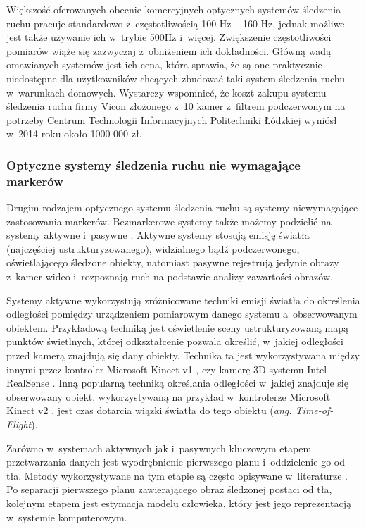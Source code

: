 Większość oferowanych obecnie komercyjnych optycznych systemów śledzenia ruchu pracuje standardowo z~częstotliwością 100 Hz -- 160 Hz, jednak możliwe jest także używanie ich w~trybie 500Hz i~więcej. Zwiększenie częstotliwości pomiarów wiąże się zazwyczaj z~obniżeniem ich dokładności.
Główną wadą omawianych systemów jest ich cena, która sprawia, że są one praktycznie niedostępne dla użytkowników chcących zbudować taki system śledzenia ruchu w~warunkach domowych. Wystarczy wspomnieć, że koszt zakupu systemu śledzenia ruchu firmy Vicon złożonego z~10 kamer z~filtrem podczerwonym na potrzeby Centrum Technologii Informacyjnych Politechniki Łódzkiej  wyniósł w~2014 roku około 1000 000 zł.
			 
\subsubsection*{Optyczne systemy śledzenia ruchu nie wymagające markerów}\label{chap:mocaps:Kinect}
Drugim rodzajem optycznego systemu śledzenia ruchu są systemy niewymagające zastosowania markerów. Bezmarkerowe systemy także możemy podzielić na systemy aktywne i~pasywne \cite{Mundermann2006}. Aktywne systemy stosują emisję światła (najczęściej ustrukturyzowanego), widzialnego bądź podczerwonego, oświetlającego śledzone obiekty, natomiast pasywne rejestrują jedynie obrazy z~kamer wideo i~rozpoznają ruch na podstawie analizy zawartości obrazów. 

Systemy aktywne wykorzystują zróżnicowane techniki emisji światła do określenia odległości pomiędzy urządzeniem pomiarowym danego systemu a~obserwowanym obiektem. Przykładową techniką jest oświetlenie sceny ustrukturyzowaną mapą punktów świetlnych, której odkształcenie pozwala określić, w~jakiej odległości przed kamerą znajdują się dany obiekty. Technika ta jest wykorzystywana między innymi przez kontroler Microsoft Kinect v1 , czy kamerę 3D systemu Intel RealSense . Inną popularną techniką określania odległości w~jakiej znajduje się obserwowany obiekt, wykorzystywaną na przykład w~kontrolerze Microsoft Kinect v2 , jest czas dotarcia wiązki światła do tego obiektu (\emph{ang. Time-of-Flight})\cite{Hansard2013}.
			
Zarówno w~systemach aktywnych jak i~pasywnych kluczowym etapem przetwarzania danych jest wyodrębnienie pierwszego planu i~oddzielenie go od tła. Metody wykorzystywane na tym etapie są często opisywane w~literaturze \cite{wang2003recent, rosenhahn2008markerless, guan2009estimating, surer2011markerless, corazza2006markerless}. Po separacji pierwszego planu zawierającego obraz śledzonej postaci od tła, kolejnym etapem jest estymacja modelu człowieka, który jest jego reprezentacją w~systemie komputerowym. 
			
